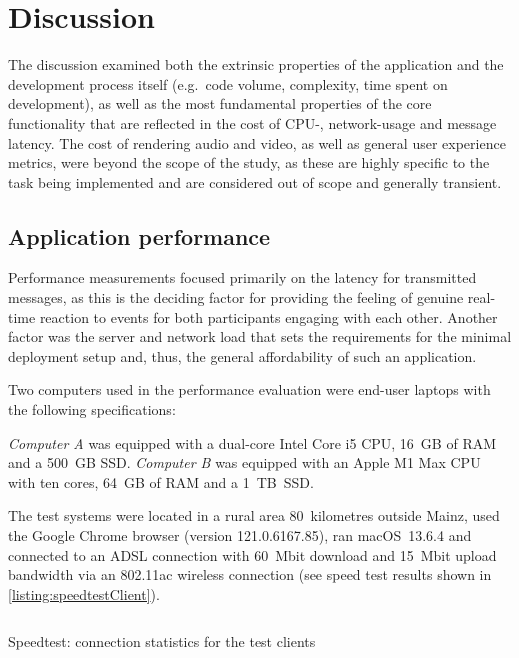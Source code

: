 \chapter{Discussion}
\label{ch:discussion}

The discussion examined both the extrinsic properties of the application and the development process itself (e.g.\ code volume, complexity, time spent on development), as well as the most fundamental properties of the core functionality that are reflected in the cost of \ac{CPU}-, network-usage and message latency.
The cost of rendering audio and video, as well as general user experience metrics, were beyond the scope of the study, as these are highly specific to the task being implemented and are considered out of scope and generally transient.

\section{Application performance}
\label{sec:statistics}

Performance measurements focused primarily on the latency for transmitted messages, as this is the deciding factor for providing the feeling of genuine real-time reaction to events for both participants engaging with each other.
Another factor was the server and network load that sets the requirements for the minimal deployment setup and, thus, the general affordability of such an application.

Two computers used in the performance evaluation were end-user laptops with the following specifications:

\emph{Computer A} was equipped with a dual-core Intel Core i5 \ac{CPU}, 16~\ac{GB} of \ac{RAM} and a 500~\ac{GB} \ac{SSD}.
\emph{Computer B} was equipped with an Apple M1 Max \ac{CPU} with ten cores, 64~\ac{GB} of \ac{RAM} and a 1~\ac{TB}~\ac{SSD}.

The test systems were located in a rural area 80~kilometres outside Mainz, used the Google Chrome browser (version 121.0.6167.85), ran macOS~13.6.4 and connected to an \ac{ADSL} connection with 60~\ac{Mbit} download and 15~\ac{Mbit} upload bandwidth via an 802.11ac wireless connection (see speed test results shown in \autoref{listing:speedtestClient}).

\begin{listing}[!ht]
\inputminted{text}{04_Artefakte/03_Listings/speedtest-client.txt}
\caption{Speedtest: connection statistics for the test clients\protect}
\label{listing:speedtestClient}
\end{listing}

